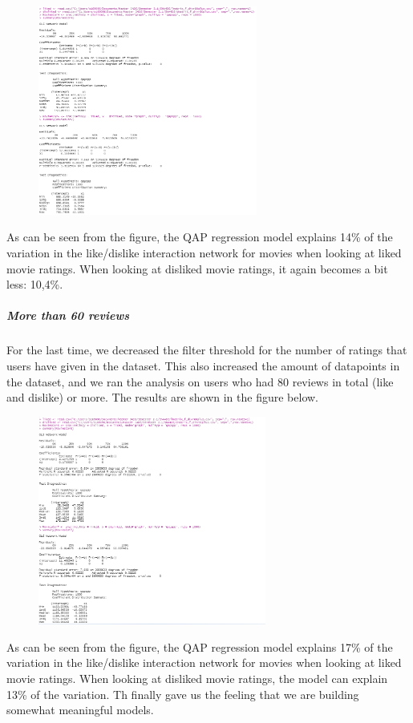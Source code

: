 \documentclass[
  english,
  man,floatsintext]{apa6}
\let\oldsubparagraph\subparagraph
\renewcommand{\subparagraph}[1]{\oldsubparagraph{#1}\mbox{}}
\begin{document}
\begin{figure}
\includegraphics[width=2.83in]{results80plus} \caption{ }\label{fig:unnamed-chunk-9}
\end{figure}

As can be seen from the figure, the QAP regression model explains 14\% of the variation in the like/dislike interaction network for movies when looking at liked movie ratings. When looking at disliked movie ratings, it again becomes a bit less: 10,4\%.

\hypertarget{more-than-60-reviews}{%
\subparagraph{More than 60 reviews}\label{more-than-60-reviews}}

For the last time, we decreased the filter threshold for the number of ratings that users have given in the dataset. This also increased the amount of datapoints in the dataset, and we ran the analysis on users who had 80 reviews in total (like and dislike) or more. The results are shown in the figure below.

\begin{figure}
\includegraphics[width=2.95in]{results60plus} \caption{ }\label{fig:unnamed-chunk-10}
\end{figure}

As can be seen from the figure, the QAP regression model explains 17\% of the variation in the like/dislike interaction network for movies when looking at liked movie ratings. When looking at disliked movie ratings, the model can explain 13\% of the variation. Th finally gave us the feeling that we are building somewhat meaningful models.
\end{document}
